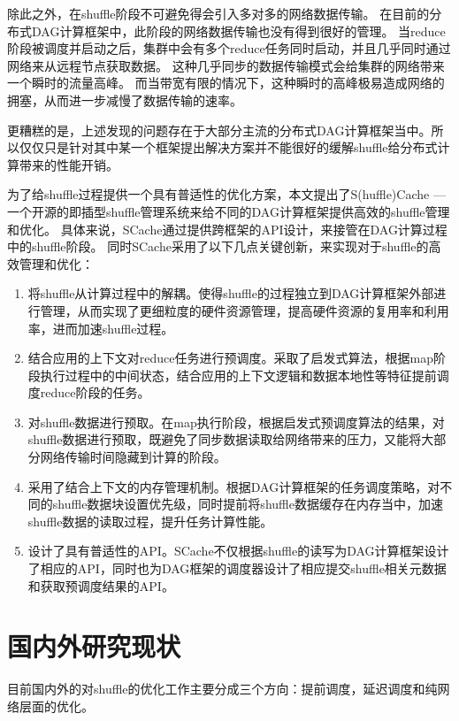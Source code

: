 除此之外，在shuffle阶段不可避免得会引入多对多的网络数据传输。
在目前的分布式DAG计算框架中，此阶段的网络数据传输也没有得到很好的管理。
当reduce阶段被调度并启动之后，集群中会有多个reduce任务同时启动，并且几乎同时通过网络来从远程节点获取数据。
这种几乎同步的数据传输模式会给集群的网络带来一个瞬时的流量高峰。
而当带宽有限的情况下，这种瞬时的高峰极易造成网络的拥塞，从而进一步减慢了数据传输的速率。

更糟糕的是，上述发现的问题存在于大部分主流的分布式DAG计算框架当中。所以仅仅只是针对其中某一个框架提出解决方案并不能很好的缓解shuffle给分布式计算带来的性能开销。

为了给shuffle过程提供一个具有普适性的优化方案，本文提出了S(huffle)Cache --- 一个开源的即插型shuffle管理系统来给不同的DAG计算框架提供高效的shuffle管理和优化。
具体来说，SCache通过提供跨框架的API设计，来接管在DAG计算过程中的shuffle阶段。
同时SCache采用了以下几点关键创新，来实现对于shuffle的高效管理和优化：

\begin{enumerate}
	\item 将shuffle从计算过程中的解耦。使得shuffle的过程独立到DAG计算框架外部进行管理，从而实现了更细粒度的硬件资源管理，提高硬件资源的复用率和利用率，进而加速shuffle过程。
	\item 结合应用的上下文对reduce任务进行预调度。采取了启发式算法，根据map阶段执行过程中的中间状态，结合应用的上下文逻辑和数据本地性等特征提前调度reduce阶段的任务。
	\item 对shuffle数据进行预取。在map执行阶段，根据启发式预调度算法的结果，对shuffle数据进行预取，既避免了同步数据读取给网络带来的压力，又能将大部分网络传输时间隐藏到计算的阶段。
	\item 采用了结合上下文的内存管理机制。根据DAG计算框架的任务调度策略，对不同的shuffle数据块设置优先级，同时提前将shuffle数据缓存在内存当中，加速shuffle数据的读取过程，提升任务计算性能。
	\item 设计了具有普适性的API。SCache不仅根据shuffle的读写为DAG计算框架设计了相应的API，同时也为DAG框架的调度器设计了相应提交shuffle相关元数据和获取预调度结果的API。
\end{enumerate}

\section{国内外研究现状}
\label{sec:relatedwork}

目前国内外的对shuffle的优化工作主要分成三个方向：提前调度，延迟调度和纯网络层面的优化。

